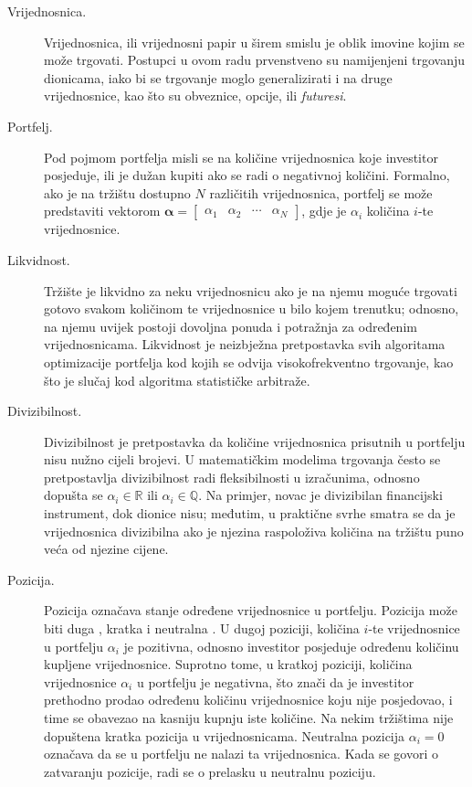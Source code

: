 \documentclass[lmodern, utf8, diplomski, numeric]{fer}
\newcommand{\matr}[1]{\mathbold{#1}}
\begin{document}
  \begin{description}
    \item[Vrijednosnica.] Vrijednosnica, ili vrijednosni papir  u širem smislu je oblik imovine kojim se može trgovati.
    Postupci u ovom radu prvenstveno su namijenjeni trgovanju dionicama, iako bi se trgovanje moglo generalizirati i na druge vrijednosnice, kao što su obveznice, opcije, ili \textit{futuresi}.
    
    \item[Portfelj.] Pod pojmom portfelja misli se na količine vrijednosnica koje investitor posjeduje, ili je dužan kupiti ako se radi o negativnoj količini.
    Formalno, ako je na tržištu dostupno $N$ različitih vrijednosnica, portfelj se može predstaviti vektorom $\matr{\alpha} = \begin{bmatrix} \alpha_1 & \alpha_2 & \cdots & \alpha_N \end{bmatrix}$, gdje je $\alpha_i$ količina $i$-te vrijednosnice.
    
    \item[Likvidnost.]
    Tržište je likvidno za neku vrijednosnicu ako je na njemu moguće trgovati gotovo svakom količinom te vrijednosnice u bilo kojem trenutku; odnosno, na njemu uvijek postoji dovoljna ponuda i potražnja za određenim vrijednosnicama.
    Likvidnost je neizbježna pretpostavka svih algoritama optimizacije portfelja kod kojih se odvija visokofrekventno trgovanje, kao što je slučaj kod algoritma statističke arbitraže.
    
    \item[Divizibilnost.]
    Divizibilnost je pretpostavka da količine vrijednosnica prisutnih u portfelju nisu nužno cijeli brojevi.
    U matematičkim modelima trgovanja često se pretpostavlja divizibilnost radi fleksibilnosti u izračunima, odnosno dopušta se $\alpha_i \in \mathbb{R}$ ili $\alpha_i \in \mathbb{Q}$.
    Na primjer, novac je divizibilan financijski instrument, dok dionice nisu; međutim, u praktične svrhe smatra se da je vrijednosnica divizibilna ako je njezina raspoloživa količina na tržištu puno veća od njezine cijene.
    
    \item[Pozicija.]
    Pozicija označava stanje određene vrijednosnice u portfelju.
    Pozicija može biti duga , kratka  i neutralna .
    U dugoj poziciji, količina $i$-te vrijednosnice u portfelju $\alpha_i$ je pozitivna, odnosno investitor posjeduje određenu količinu kupljene vrijednosnice.
    Suprotno tome, u kratkoj poziciji, količina vrijednosnice $\alpha_i$ u portfelju je negativna, što znači da je investitor prethodno prodao određenu količinu vrijednosnice koju nije posjedovao, i time se obavezao na kasniju kupnju iste količine.
    Na nekim tržištima nije dopuštena kratka pozicija u vrijednosnicama.
    Neutralna pozicija $\alpha_i = 0$ označava da se u portfelju ne nalazi ta vrijednosnica.
    Kada se govori o zatvaranju pozicije, radi se o prelasku u neutralnu poziciju.
    

\end{description}
\end{document}
